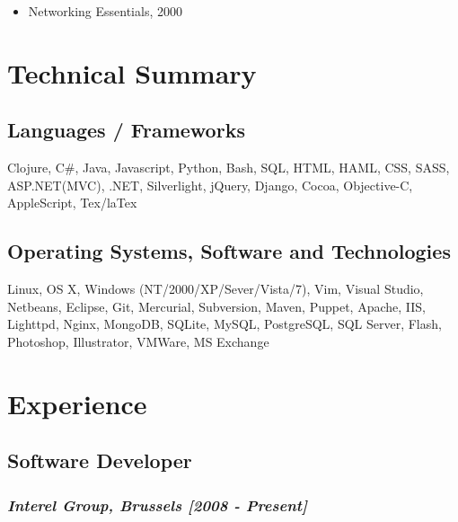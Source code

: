 \documentclass{article}
\begin{document}
\begin{itemize}
\item Networking Essentials, 2000
\end{itemize}
\section*{Technical Summary}
\label{sec-2}

\subsection*{Languages / Frameworks}
\label{sec-2.1}

Clojure, C\#, Java, Javascript, Python, Bash, SQL, HTML, HAML, CSS, SASS, ASP.NET(MVC), .NET, Silverlight, jQuery, Django, Cocoa, Objective-C, AppleScript, Tex/laTex
\subsection*{Operating Systems, Software and Technologies}
\label{sec-2.2}

Linux, OS X, Windows (NT/2000/XP/Sever/Vista/7), Vim, Visual Studio, Netbeans, Eclipse, Git, Mercurial, Subversion, Maven, Puppet, Apache, IIS, Lighttpd, Nginx, MongoDB, SQLite, MySQL, PostgreSQL, SQL Server, Flash, Photoshop, Illustrator, VMWare, MS Exchange
\section*{Experience}
\label{sec-3}

\subsection*{Software Developer}
\label{sec-3.1}

\subsubsection*{\emph{Interel Group, Brussels  [2008 - Present]}}
\label{sec-3.1.1}
\end{document}
